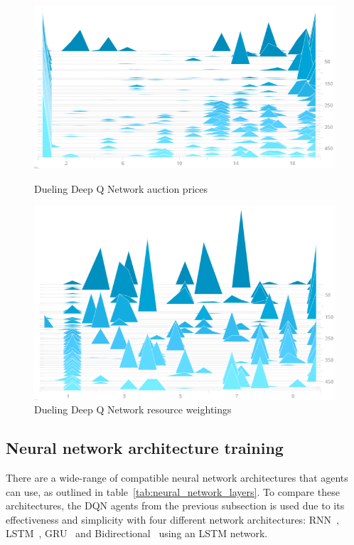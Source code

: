 \begin{figure}[H]
    \centering
    \begin{minipage}{0.5\textwidth}
        \centering
        \includegraphics[width=1.0\textwidth]{figures/4_test_eval_figs/algo_training_fig/dueling_dqn_auction_prices.png}
        \caption{Dueling Deep Q Network auction prices}
        \label{fig:dueling-dqn-auction-prices}
    \end{minipage}\hfill
    \begin{minipage}{0.5\textwidth}
        \centering
        \includegraphics[width=1.0\textwidth]{figures/4_test_eval_figs/algo_training_fig/dueling_dqn_weightings.png}
        \caption{Dueling Deep Q Network resource weightings}
        \label{fig:dueling-dqn-resource-weightings}
    \end{minipage}
\end{figure}

\subsection{Neural network architecture training}\label{subsec:neural-network-architecture-training}
There are a wide-range of compatible neural network architectures that agents can use, as outlined in
table~\ref{tab:neural_network_layers}. To compare these architectures, the DQN agents from the previous subsection is
used due to its effectiveness and simplicity with four different network architectures: RNN~\citep{RNN},
LSTM~\citep{LSTM}, GRU~\citep{GRU} and Bidirectional~\citep{Bidirectional} using an LSTM network. \\

